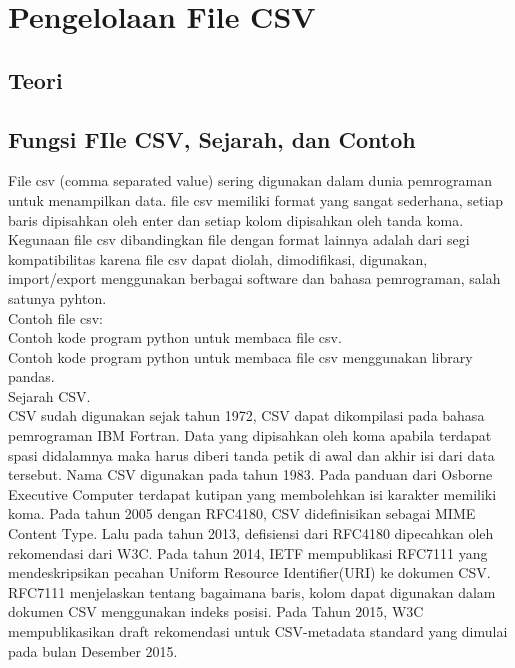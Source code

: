 \chapter{Pengelolaan File CSV}

\section{Teori}
\section{Fungsi FIle CSV, Sejarah, dan Contoh}
File csv (comma separated value) sering digunakan dalam dunia pemrograman untuk menampilkan data. file csv memiliki format yang sangat sederhana, setiap baris dipisahkan oleh enter dan setiap kolom dipisahkan oleh tanda koma.\\
Kegunaan file csv dibandingkan file dengan format lainnya adalah dari segi kompatibilitas karena file csv dapat diolah, dimodifikasi, digunakan, import/export menggunakan berbagai software dan bahasa pemrograman, salah satunya pyhton.\\
Contoh file csv:\\

Contoh kode program python untuk membaca file csv.\\

Contoh kode program python untuk membaca file csv menggunakan library pandas.\\

Sejarah CSV.\\
CSV sudah digunakan sejak tahun 1972, CSV dapat dikompilasi pada bahasa pemrograman IBM Fortran. Data yang dipisahkan oleh koma apabila terdapat spasi didalamnya maka harus diberi tanda petik di awal dan akhir isi dari data tersebut. Nama CSV digunakan pada tahun 1983. Pada panduan dari Osborne Executive Computer terdapat kutipan yang membolehkan isi karakter memiliki koma. Pada tahun 2005 dengan RFC4180, CSV didefinisikan sebagai MIME Content Type. Lalu pada tahun 2013, defisiensi dari RFC4180 dipecahkan oleh rekomendasi dari W3C. Pada tahun 2014, IETF mempublikasi RFC7111 yang mendeskripsikan pecahan Uniform Resource Identifier(URI) ke dokumen CSV. RFC7111 menjelaskan tentang bagaimana baris, kolom dapat digunakan dalam dokumen CSV menggunakan indeks posisi. Pada Tahun 2015, W3C mempublikasikan draft rekomendasi untuk CSV-metadata standard yang dimulai pada bulan Desember 2015. 
